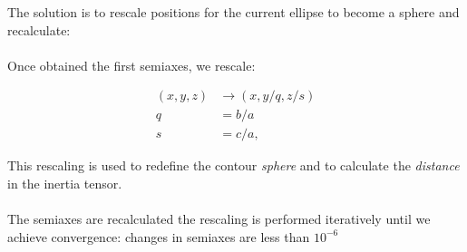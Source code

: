 \documentclass[xcolor=dvipsnames]{beamer}
\begin{document}
\begin{frame}
\small

The solution is to rescale positions for the current ellipse to become a sphere and recalculate:\\~\\

Once obtained the first semiaxes, we rescale:

\begin{align}
(x,y,z) &\rightarrow (x,y/q,z/s) \\
q &=  b/a\\
s &= c/a,
\end{align}

This rescaling is used to redefine the contour \textit{sphere} and to calculate the \textit{distance} in the inertia tensor.\\~\\

The semiaxes are recalculated the rescaling is performed iteratively until we achieve convergence: changes in semiaxes are less than $10^{-6}$


\end{frame}

\end{document}
